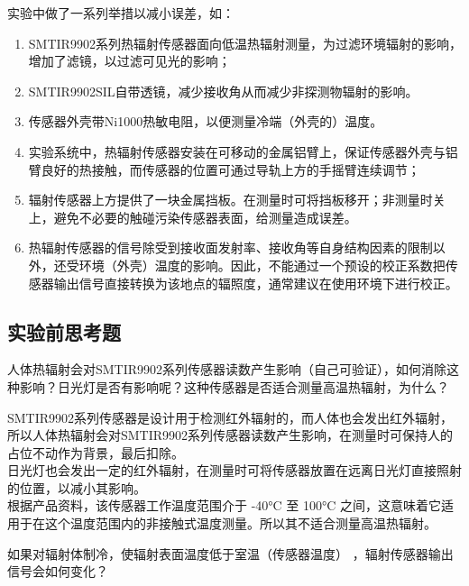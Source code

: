 \documentclass[dvipsnames, svgnames,a4paper,11pt]{article}
\begin{document}
	实验中做了一系列举措以减小误差，如：
	\begin{enumerate}
		\item SMTIR9902系列热辐射传感器面向低温热辐射测量，为过滤环境辐射的影响，增加了滤镜，以过滤可见光的影响；
		\item SMTIR9902SIL自带透镜，减少接收角从而减少非探测物辐射的影响。
		\item 传感器外壳带Ni1000热敏电阻，以便测量冷端（外壳的）温度。
		\item 实验系统中，热辐射传感器安装在可移动的金属铝臂上，保证传感器外壳与铝臂良好的热接触，而传感器的位置可通过导轨上方的手摇臂连续调节；
		\item 辐射传感器上方提供了一块金属挡板。在测量时可将挡板移开；非测量时关上，避免不必要的触碰污染传感器表面，给测量造成误差。
		\item 热辐射传感器的信号除受到接收面发射率、接收角等自身结构因素的限制以外，还受环境（外壳）温度的影响。因此，不能通过一个预设的校正系数把传感器输出信号直接转换为该地点的辐照度，通常建议在使用环境下进行校正。
	\end{enumerate}
	
	




\subsection{实验前思考题}

	\begin{question}
		人体热辐射会对SMTIR9902系列传感器读数产生影响（自己可验证），如何消除这种影响？日光灯是否有影响呢？这种传感器是否适合测量高温热辐射，为什么？
	\end{question}

	SMTIR9902系列传感器是设计用于检测红外辐射的，而人体也会发出红外辐射，所以人体热辐射会对SMTIR9902系列传感器读数产生影响，在测量时可保持人的占位不动作为背景，最后扣除。\\

	日光灯也会发出一定的红外辐射，在测量时可将传感器放置在远离日光灯直接照射的位置，以减小其影响。\\

	根据产品资料，该传感器工作温度范围介于 -40°C 至 100°C 之间，这意味着它适用于在这个温度范围内的非接触式温度测量。所以其不适合测量高温热辐射。


\begin{question}
	如果对辐射体制冷，使辐射表面温度低于室温（传感器温度） ，辐射传感器输出信号会如何变化？
\end{question}
\end{document}
